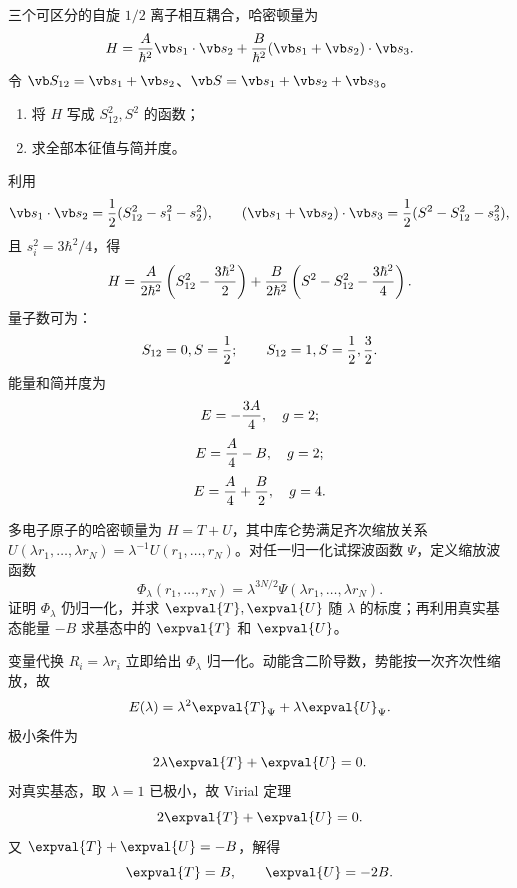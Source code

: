 \begin{question}
三个可区分的自旋 $1/2$ 离子相互耦合，哈密顿量为
\[
  H={A\over\hbar^2}\vb s_1\cdot\vb s_2+{B\over\hbar^2}(\vb s_1+\vb s_2)\cdot\vb s_3.
\]
令 $\vb S_{12}=\vb s_1+\vb s_2$、$\vb S=\vb s_1+\vb s_2+\vb s_3$。
\begin{enumerate}
  \item 将 $H$ 写成 $S_{12}^2,S^2$ 的函数；
  \item 求全部本征值与简并度。
\end{enumerate}
\begin{solution}
利用
\[
  \vb s_1\cdot\vb s_2={1\over2}(S_{12}^2-s_1^2-s_2^2),
  \qquad
  (\vb s_1+\vb s_2)\cdot\vb s_3={1\over2}(S^2-S_{12}^2-s_3^2),
\]
且 $s_i^2=3\hbar^2/4$，得
\[
  H={A\over2\hbar^2}\left(S_{12}^2-{3\hbar^2\over2}\right)
  +{B\over2\hbar^2}\left(S^2-S_{12}^2-{3\hbar^2\over4}\right).
\]
量子数可为：
\[
  S_{12}=0, S={1\over2};
  \qquad S_{12}=1, S={1\over2},{3\over2}.
\]
能量和简并度为
\[
  E=-{3A\over4},\quad g=2;
\]
\[
  E={A\over4}-B,\quad g=2;
\]
\[
  E={A\over4}+{B\over2},\quad g=4.
\]
\end{solution}
\end{question}

\begin{question}
多电子原子的哈密顿量为 $H=T+U$，其中库仑势满足齐次缩放关系 $U(\lambda r_1,\ldots,\lambda r_N)=\lambda^{-1}U(r_1,\ldots, r_N)$。对任一归一化试探波函数 $\Psi$，定义缩放波函数
\[
  \Phi_\lambda(r_1,\ldots, r_N)=\lambda^{3N/2}\Psi(\lambda r_1,\ldots,\lambda r_N).
\]
证明 $\Phi_\lambda$ 仍归一化，并求 $\expval{T},\expval{U}$ 随 $\lambda$ 的标度；再利用真实基态能量 $-B$ 求基态中的 $\expval{T}$ 和 $\expval{U}$。
\begin{solution}
变量代换 $R_i=\lambda r_i$ 立即给出 $\Phi_\lambda$ 归一化。动能含二阶导数，势能按一次齐次性缩放，故
\[
  E(\lambda)=\lambda^2\expval{T}_\Psi+\lambda\expval{U}_\Psi.
\]
极小条件为
\[
  2\lambda\expval{T}+\expval{U}=0.
\]
对真实基态，取 $\lambda=1$ 已极小，故 Virial 定理
\[
  2\expval{T}+\expval{U}=0.
\]
又 $\expval{T}+\expval{U}=-B$，解得
\[
  \expval{T}=B,
  \qquad \expval{U}=-2B.
\]
\end{solution}
\end{question}

